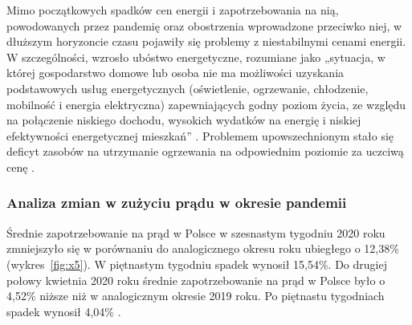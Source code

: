 \documentclass[polish, twoside, 12pt, a4paper]{article}
\theoremstyle{definition}
\theoremstyle{plain}
\theoremstyle{remark}
\begin{document}
Mimo początkowych spadków cen energii i zapotrzebowania na nią, powodowanych przez pandemię oraz obostrzenia wprowadzone przeciwko niej, w dłuższym horyzoncie czasu pojawiły się problemy z niestabilnymi cenami energii. W szczególności, wzrosło ubóstwo  energetyczne, rozumiane jako „sytuacja, w której gospodarstwo domowe lub osoba nie ma możliwości uzyskania podstawowych usług energetycznych (oświetlenie, ogrzewanie, chłodzenie, mobilność i energia elektryczna) zapewniających godny poziom życia, ze względu na połączenie niskiego dochodu, wysokich wydatków na energię i niskiej efektywności energetycznej  mieszkań” \citep{gorska2023}. Problemem upowszechnionym stało się deficyt zasobów na utrzymanie ogrzewania na odpowiednim poziomie za uczciwą cenę \citep{gorska2023}. 


\subsubsection{Analiza zmian w zużyciu prądu w okresie pandemii}

Średnie zapotrzebowanie na prąd w Polsce w szesnastym tygodniu 2020 roku zmniejszyło się w porównaniu do analogicznego okresu roku ubiegłego o 12,38\% (wykres~\ref{fig:x5}). W piętnastym tygodniu spadek wynosił 15,54\%. Do drugiej połowy kwietnia 2020 roku średnie zapotrzebowanie na prąd w Polsce było o 4,52\% niższe niż w analogicznym okresie 2019 roku. Po piętnastu tygodniach spadek wynosił 4,04\% \citep{biuroanalizpfr2020}.
\end{document}
